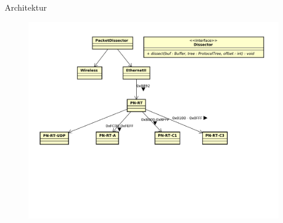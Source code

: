 \begin{frame}{Architektur}
    \begin{figure}
    	\centering
    	\includegraphics[width=\textwidth]{./images/dissector/5.pdf}
    \end{figure}
\end{frame}
